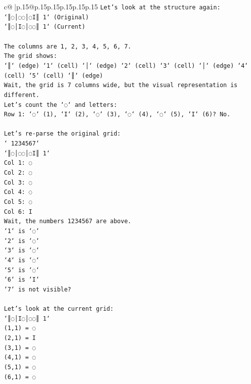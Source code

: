 \documentclass{article}
\begin{document}
{\begin{supertabular}{c@{$\;$}|p{.15\linewidth}@{}p{.15\linewidth}p{.15\linewidth}p{.15\linewidth}p{.15\linewidth}p{.15\linewidth}}
{{{\texttt{Let's look at the structure again:} \\
\texttt{`║◌│◌◌│◌I║ 1` (Original)} \\
\texttt{`║◌│I◌│◌◌║ 1` (Current)} \\
\\ 
\texttt{The columns are 1, 2, 3, 4, 5, 6, 7.} \\
\texttt{The grid shows:} \\
\texttt{`║` (edge) `1` (cell) `│` (edge) `2` (cell) `3` (cell) `│` (edge) `4` (cell) `5` (cell) `║` (edge)} \\
\texttt{Wait, the grid is 7 columns wide, but the visual representation is different.} \\
\texttt{Let's count the `◌` and letters:} \\
\texttt{Row 1: `◌` (1), `I` (2), `◌` (3), `◌` (4), `◌` (5), `I` (6)? No.} \\
\\ 
\texttt{Let's re{-}parse the original grid:} \\
\texttt{` 1234567`} \\
\texttt{`║◌│◌◌│◌I║ 1`} \\
\texttt{Col 1: ◌} \\
\texttt{Col 2: ◌} \\
\texttt{Col 3: ◌} \\
\texttt{Col 4: ◌} \\
\texttt{Col 5: ◌} \\
\texttt{Col 6: I} \\
\texttt{Wait, the numbers 1234567 are above.} \\
\texttt{`1` is `◌`} \\
\texttt{`2` is `◌`} \\
\texttt{`3` is `◌`} \\
\texttt{`4` is `◌`} \\
\texttt{`5` is `◌`} \\
\texttt{`6` is `I`} \\
\texttt{`7` is not visible?} \\
\\ 
\texttt{Let's look at the current grid:} \\
\texttt{`║◌│I◌│◌◌║ 1`} \\
\texttt{(1,1) = ◌} \\
\texttt{(2,1) = I} \\
\texttt{(3,1) = ◌} \\
\texttt{(4,1) = ◌} \\
\texttt{(5,1) = ◌} \\
\texttt{(6,1) = ◌} \\
}}}
\end{supertabular}}
\end{document}
